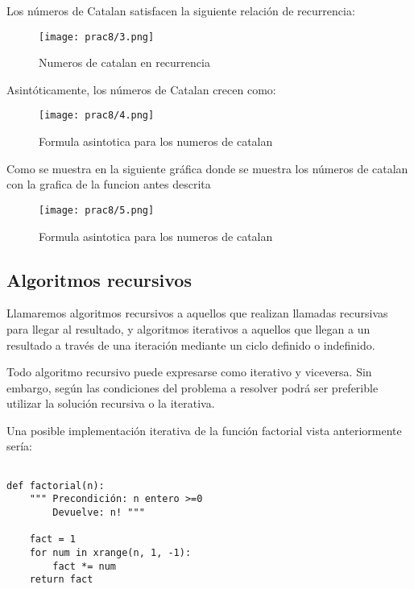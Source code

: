 \documentclass[12pt,twoside]{article}
\begin{document}

\noindent
Los números de Catalan satisfacen la siguiente relación de recurrencia:
\begin{figure}[h!]
    \centering
    \texttt{[image: prac8/3.png]} %
    \caption{Numeros de catalan en recurrencia}
\end{figure}
\noindent
Asintóticamente, los números de Catalan crecen como:

\begin{figure}[h!]
    \centering
    \texttt{[image: prac8/4.png]} %
    \caption{Formula asintotica para los numeros de catalan}
\end{figure}

\noindent
Como se muestra en la siguiente gráfica donde se muestra los números de catalan con la grafica de la funcion antes descrita

 
\begin{figure}[H]
    \centering
    \texttt{[image: prac8/5.png]} %
    \caption{Formula asintotica para los numeros de catalan}
\end{figure}

\subsection{Algoritmos recursivos}
Llamaremos algoritmos recursivos a aquellos que realizan llamadas recursivas para llegar al resultado, y algoritmos iterativos a aquellos que llegan a un resultado a través de una iteración mediante un ciclo definido o indefinido.

Todo algoritmo recursivo puede expresarse como iterativo y viceversa. Sin embargo, según las condiciones del problema a resolver podrá ser preferible utilizar la solución recursiva o la iterativa.

Una posible implementación iterativa de la función factorial vista anteriormente sería:

\begin{verbatim}

def factorial(n):
    """ Precondición: n entero >=0
        Devuelve: n! """

    fact = 1
    for num in xrange(n, 1, -1):
        fact *= num
    return fact


\end{verbatim}
\end{document}
